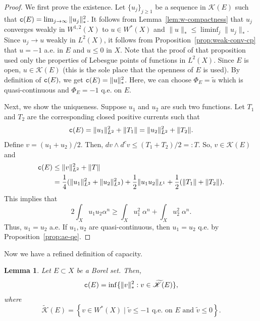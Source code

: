 \documentclass{amsart}
\newcommand{\wt}[1]{\widetilde{#1}}
\newcommand{\al}{\alpha}
\newcommand{\tc}{{\tt c}}
\newcommand{\cali}[1]{\mathscr{#1}}
\newcommand{\Kc}{\cali{K}}
\newtheorem{lem}[thm]{Lemma}
\theoremstyle{definition}
\numberwithin{thm}{section}
\numberwithin{equation}{section}
\renewcommand{\[}{\begin{equation}}
\renewcommand{\]}{\end{equation}}
\newcommand{\wed}{\wedge}
\begin{document}
\begin{proof} We first prove the existence. Let $\{u_j\}_{j\geq 1}$ be a sequence in $\Kc(E)$ such that $\tc(E) = \lim_{j\to \infty} \|u_j\|_*^2$. It follows from Lemma~\ref{lem:w-compactness} that $u_j$ converges weakly in $W^{1,2}(X)$ to  $u \in W^*(X)$ and $\|u\|_* \leq \liminf_j \|u_j\|_*$. Since $u_j \to u$ weakly in $L^2(X)$,  it follows from Proposition~\ref{prop:weak-conv-cp} that $u =-1$ a.e. in $E$ and $u\leq 0$ in $X$. Note that  the proof of that proposition used only the properties of Lebesgue points of functions in $L^2(X)$. Since $E$ is open,  $u\in \Kc(E)$ (this is the sole place that the openness of $E$ is used). By definition of  $\tc(E),$ we get $\tc(E) = \|u\|_*^2$. Here, we can choose $\Phi_E = \wt u$ which is quasi-continuous and $\Phi_E =-1$ q.e. on $E$.

Next,  we show the uniqueness. Suppose $u_1$ and $u_2$ are such two functions. Let $T_1$ and $T_2$ are the corresponding closed positive currents such that
$$
	\tc(E) = \|u_1\|_{L^2}^2 + \|T_1\| = \|u_2\|_{L^2}^2 + \|T_2\|.
$$  
Define $v = (u_1+u_2)/2$. Then, 
$
	dv \wed d^c v \leq (T_1 +T_2)/2 =:T.
$
So, $v\in \Kc(E)$ and 
$$\begin{aligned}
	\tc(E) &\leq \|v\|_{L^2}^2 + \|T\| \\&=\frac{1}{4} (\|u_1\|_{L^2}^2 + \| u_2\|_{L^2}^2) + \frac{1}{2} \|u_1u_2\|_{L^1} + \frac{1}{2} (\|T_1\|+ \|T_2\|). 
\end{aligned}$$
This implies that 
$$
	2\int_X u_1 u_2  \al^n \geq \int_X u_1^2 \;\al^n + \int_X u_2^2 \; \al^n.
$$
Thus, $u_1 = u_2$ a.e. If $u_1, u_2$ are quasi-continuous, then  $u_1=u_2$ q.e. by Proposition~\ref{prop:ae-qe}.
\end{proof}


Now we have a refined definition of capacity.
 
\begin{lem} \label{lem:cap-refine} Let $E \subset X$ be a Borel set. Then,
$$
	\tc(E) = \inf\{\|v\|_*^2 : v \in 
	\wt\Kc(E)\},
$$
where 
$$
 	\wt\Kc(E) = \left\{ v \in W^*(X) \;\rvert\; \wt v \leq  -1 \text{ q.e. on $E$ and } \wt v\leq 0 \right\}.
$$
\end{lem}
\end{document}
